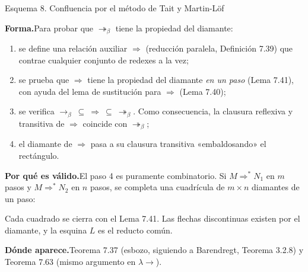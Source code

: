 \documentclass[11pt,a4paper]{article}
\newcommand{\forma}{\par\noindent\textbf{Forma.}\enspace}
\newcommand{\porque}{\par\smallskip\noindent\textbf{Por qué es válido.}\enspace}
\newcommand{\donde}{\par\smallskip\noindent\textbf{Dónde aparece.}\enspace}
\newcommand{\bred}{\rightarrow_\beta}
\newcommand{\bmred}{\twoheadrightarrow_\beta}
\newcommand{\pr}{\Rightarrow}
\begin{document}
\begin{esquema}{Esquema 8. Confluencia por el método de Tait y Martin-Löf}\label{esq:tml}
\forma Para probar que \(\bmred\) tiene la propiedad del diamante:
\begin{enumerate}
  \item se define una relación auxiliar \(\pr\) (reducción paralela,
    Definición 7.39) que contrae cualquier conjunto de redexes a la vez;
  \item se prueba que \(\pr\) tiene la propiedad del diamante \emph{en un
    paso} (Lema 7.41), con ayuda del lema de sustitución para \(\pr\)
    (Lema 7.40);
  \item se verifica \(\bred\ \subseteq\ \pr\ \subseteq\ \bmred\). Como
    consecuencia, la clausura reflexiva y transitiva de \(\pr\) coincide con
    \(\bmred\);
  \item el diamante de \(\pr\) pasa a su clausura transitiva «embaldosando»
    el rectángulo.
\end{enumerate}

\porque El paso 4 es puramente combinatorio. Si \(M\pr^{*}N_1\) en \(m\) pasos
y \(M\pr^{*}N_2\) en \(n\) pasos, se completa una cuadrícula de
\(m\times n\) diamantes de un paso:
\begin{center}
\end{center}
Cada cuadrado se cierra con el Lema 7.41. Las flechas discontinuas existen
por el diamante, y la esquina \(L\) es el reducto común.

\donde Teorema 7.37 (esbozo, siguiendo a Barendregt, Teorema 3.2.8) y
Teorema 7.63 (mismo argumento en \(\lambda\!\to\)).
\end{esquema}
\end{document}

